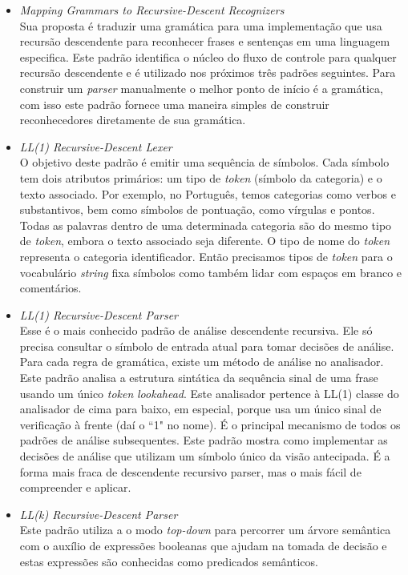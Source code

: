 \begin{itemize}
	\item \emph{Mapping Grammars to Recursive-Descent Recognizers}\\

	Sua proposta é traduzir uma gramática para uma implementação que usa recursão descendente 
para reconhecer frases e sentenças em uma linguagem especifica. Este padrão identifica o núcleo do fluxo de controle 
para qualquer recursão descendente e é utilizado nos próximos três 
padrões seguintes. Para construir um \textit{parser}
manualmente o melhor ponto de início é a gramática, com isso este padrão fornece uma maneira simples de construir reconhecedores diretamente de sua gramática.
	
	\item \emph{LL(1) Recursive-Descent Lexer}\\

	O objetivo deste padrão é emitir uma sequência de símbolos. Cada símbolo tem dois atributos primários: 
um tipo de \textit{token} (símbolo da categoria) e o texto associado. Por exemplo, 
	no Português, temos categorias como verbos e substantivos, bem como símbolos de pontuação, como vírgulas e pontos. Todas as palavras dentro de uma determinada categoria são do mesmo tipo de \textit{token}, embora o texto associado seja diferente. O tipo de nome do \textit{token} representa o categoria identificador. Então precisamos tipos de \textit{token} para o vocabulário \textit{string} fixa símbolos como também lidar com espaços em branco e comentários.

	\item \emph{LL(1) Recursive-Descent Parser}\\
	Esse é o mais conhecido padrão de análise descendente recursiva. Ele só precisa	consultar o símbolo de entrada atual para tomar decisões de análise. Para cada regra de gramática, existe um método de análise no analisador. Este padrão analisa a estrutura sintática da sequência sinal de uma frase usando um único \textit{token} \textit{lookahead}. Este analisador pertence à LL(1) classe do analisador de cima para baixo, em especial, porque usa um único sinal de verificação à frente (daí 
o ``1" no nome). É o principal mecanismo de todos os padrões de análise subsequentes. Este padrão mostra 
como implementar as decisões de análise que utilizam um símbolo único da visão antecipada. 
É a forma mais fraca de descendente recursivo parser, mas o mais fácil de compreender e aplicar.

	\item \emph{LL(k) Recursive-Descent Parser}\\
	Este padrão utiliza a o modo \textit{top-down} para percorrer um árvore semântica com o auxílio de expressões booleanas que ajudam na tomada de decisão e estas expressões são conhecidas como predicados semânticos.
	
\end{itemize}



